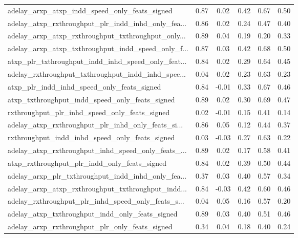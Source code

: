 \begin{tabular}{|l|*{4}{c}|r|}
adelay\_arxp\_atxp\_indd\_speed\_only\_feats\_signed      & 0.87 &  0.02 &    0.42 &       0.67 &  0.50 \\
adelay\_atxp\_rxthroughput\_plr\_indd\_inhd\_only\_fea... & 0.86 &  0.02 &    0.24 &       0.47 &  0.40 \\
adelay\_arxp\_atxp\_rxthroughput\_txthroughput\_only... & 0.89 &  0.04 &    0.19 &       0.20 &  0.33 \\
adelay\_arxp\_atxp\_txthroughput\_indd\_speed\_only\_f... & 0.87 &  0.03 &    0.42 &       0.68 &  0.50 \\
atxp\_plr\_txthroughput\_indd\_inhd\_speed\_only\_feat... & 0.84 &  0.02 &    0.29 &       0.64 &  0.45 \\
adelay\_rxthroughput\_txthroughput\_indd\_inhd\_spee... & 0.04 &  0.02 &    0.23 &       0.63 &  0.23 \\
atxp\_plr\_indd\_inhd\_speed\_only\_feats\_signed         & 0.84 & -0.01 &    0.33 &       0.67 &  0.46 \\
atxp\_txthroughput\_indd\_speed\_only\_feats\_signed     & 0.89 &  0.02 &    0.30 &       0.69 &  0.47 \\
rxthroughput\_plr\_inhd\_speed\_only\_feats\_signed      & 0.02 & -0.01 &    0.15 &       0.41 &  0.14 \\
adelay\_atxp\_rxthroughput\_plr\_inhd\_only\_feats\_si... & 0.86 &  0.05 &    0.12 &       0.44 &  0.37 \\
rxthroughput\_indd\_inhd\_speed\_only\_feats\_signed     & 0.03 & -0.03 &    0.27 &       0.63 &  0.22 \\
adelay\_atxp\_rxthroughput\_inhd\_speed\_only\_feats\_... & 0.89 &  0.02 &    0.17 &       0.58 &  0.41 \\
atxp\_rxthroughput\_plr\_indd\_only\_feats\_signed       & 0.84 &  0.02 &    0.39 &       0.50 &  0.44 \\
adelay\_arxp\_plr\_txthroughput\_indd\_inhd\_only\_fea... & 0.37 &  0.03 &    0.40 &       0.57 &  0.34 \\
adelay\_arxp\_atxp\_rxthroughput\_txthroughput\_indd... & 0.84 & -0.03 &    0.42 &       0.60 &  0.46 \\
adelay\_rxthroughput\_plr\_inhd\_speed\_only\_feats\_s... & 0.04 &  0.05 &    0.16 &       0.57 &  0.20 \\
adelay\_atxp\_txthroughput\_indd\_only\_feats\_signed    & 0.89 &  0.03 &    0.40 &       0.51 &  0.46 \\
adelay\_arxp\_rxthroughput\_plr\_only\_feats\_signed     & 0.34 &  0.04 &    0.18 &       0.40 &  0.24 \\

\end{tabular}
